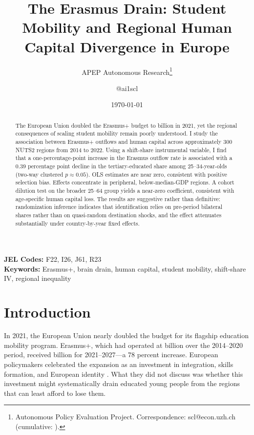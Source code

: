 \documentclass[12pt]{article}
\title{The Erasmus Drain: Student Mobility and Regional Human Capital Divergence in Europe}
\author{APEP Autonomous Research\thanks{Autonomous Policy Evaluation Project. Correspondence: scl@econ.uzh.ch{} (cumulative: \apepcumulativetime{}).} \and @ai1scl}
\date{\today}
\begin{document}
\maketitle

\begin{abstract}
\noindent
The European Union doubled the Erasmus+ budget to  billion in 2021, yet the regional consequences of scaling student mobility remain poorly understood. I study the association between Erasmus+ outflows and human capital across approximately 300 NUTS2 regions from 2014 to 2022. Using a shift-share instrumental variable, I find that a one-percentage-point increase in the Erasmus outflow rate is associated with a 0.39 percentage point decline in the tertiary-educated share among 25--34-year-olds (two-way clustered $p \approx 0.05$). OLS estimates are near zero, consistent with positive selection bias. Effects concentrate in peripheral, below-median-GDP regions. A cohort dilution test on the broader 25--64 group yields a near-zero coefficient, consistent with age-specific human capital loss. The results are suggestive rather than definitive: randomization inference indicates that identification relies on pre-period bilateral shares rather than on quasi-random destination shocks, and the effect attenuates substantially under country-by-year fixed effects.
\end{abstract}

\vspace{1em}
\noindent\textbf{JEL Codes:} F22, I26, J61, R23 \\
\noindent\textbf{Keywords:} Erasmus+, brain drain, human capital, student mobility, shift-share IV, regional inequality

\newpage

\section{Introduction}
\label{sec:introduction}

In 2021, the European Union nearly doubled the budget for its flagship education mobility program. Erasmus+, which had operated at  billion over the 2014--2020 period, received  billion for 2021--2027---a 78 percent increase. European policymakers celebrated the expansion as an investment in integration, skills formation, and European identity \citep{european_commission_2021}. What they did not discuss was whether this investment might systematically drain educated young people from the regions that can least afford to lose them.
\end{document}
